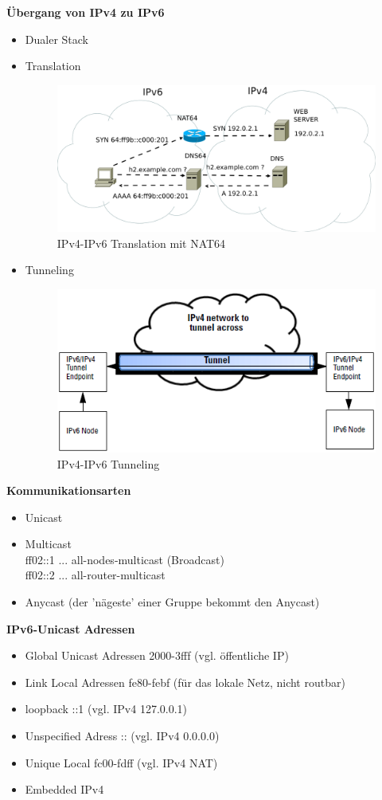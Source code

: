 \textbf{Übergang von IPv4 zu IPv6}
\begin{itemize}
	\item Dualer Stack
	\item Translation
	\begin{figure}[H]
		\centering
		\includegraphics[width=0.7\linewidth]{figures/nat64.png}
		\caption{IPv4-IPv6 Translation mit NAT64}
	\end{figure}
	\item Tunneling
		\begin{figure}[H]
		\centering
		\includegraphics[width=0.7\linewidth]{figures/ipv6_tunneling.png}
		\caption{IPv4-IPv6 Tunneling}
	\end{figure}
\end{itemize}

\textbf{Kommunikationsarten}
\begin{itemize}
	\item Unicast
	\item Multicast \\
	ff02::1 ... all-nodes-multicast (Broadcast) \\
	ff02::2 ... all-router-multicast
	\item Anycast (der 'nägeste' einer Gruppe bekommt den Anycast)
\end{itemize}

\textbf{IPv6-Unicast Adressen} \\
\begin{itemize}
	\item Global Unicast Adressen 2000-3fff (vgl. öffentliche IP)
	\item Link Local Adressen fe80-febf (für das lokale Netz, nicht routbar)
	\item loopback ::1 (vgl. IPv4 127.0.0.1)
	\item Unspecified Adress :: (vgl. IPv4 0.0.0.0)
	\item Unique Local fc00-fdff (vgl. IPv4 NAT)
	\item Embedded IPv4
\end{itemize}

